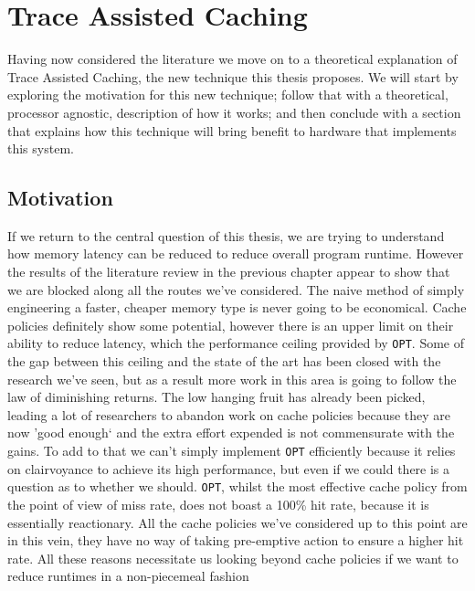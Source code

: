 \chapter{Trace Assisted Caching}
\label{chap:trace-assisted-caching}

Having now considered the literature we move on to a theoretical explanation of Trace Assisted Caching, the new technique this thesis proposes. We will start by exploring the motivation for this new technique; follow that with a theoretical, processor agnostic, description of how it works; and then conclude with a section that explains how this technique will bring benefit to hardware that implements this system.

\section{Motivation}

If we return to the central question of this thesis, we are trying to understand how memory latency can be reduced to reduce overall program runtime. However the results of the literature review in the previous chapter appear to show that we are blocked along all the routes we've considered. The naive method of simply engineering a faster, cheaper memory type is never going to be economical. Cache policies definitely show some potential, however there is an upper limit on their ability to reduce latency, which the performance ceiling provided by \texttt{OPT}. Some of the gap between this ceiling and the state of the art has been closed with the research we've seen, but as a result more work in this area is going to follow the law of diminishing returns. The low hanging fruit has already been picked, leading a lot of researchers to abandon work on cache policies because they are now 'good enough` \cite{podlipnigSurveyWebCache2003} and the extra effort expended is not commensurate with the gains. To add to that we can't simply implement \texttt{OPT} efficiently because it relies on clairvoyance to achieve its high performance, but even if we could there is a question as to whether we should. \texttt{OPT}, whilst the most effective cache policy from the point of view of miss rate, does not boast a 100\% hit rate, because it is essentially reactionary. All the cache policies we've considered up to this point are in this vein, they have no way of taking pre-emptive action to ensure a higher hit rate. All these reasons necessitate us looking beyond cache policies if we want to reduce runtimes in a non-piecemeal fashion
                                                                                                                                                                                                                                                                                                                                                                                                                                           
